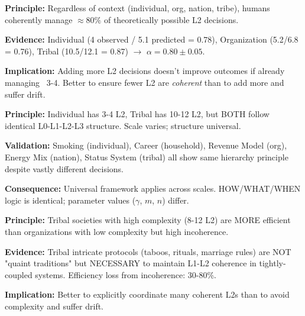 \begin{tcolorbox}[colback=blue!5!white, colframe=blue!75!black, title=Critical Foundation 3: Bounded Rationality is Universal ($\alpha \approx 0.8$)]

\textbf{Principle:} Regardless of context (individual, org, nation, tribe), humans coherently manage $\approx 80\%$ of theoretically possible L2 decisions.

\textbf{Evidence:} Individual (4 observed / 5.1 predicted = 0.78), Organization (5.2/6.8 = 0.76), Tribal (10.5/12.1 = 0.87) $\to$ $\alpha = 0.80 \pm 0.05$.

\textbf{Implication:} Adding more L2 decisions doesn't improve outcomes if already managing ~3-4. Better to ensure fewer L2 are \textit{coherent} than to add more and suffer drift.

\end{tcolorbox}

\begin{tcolorbox}[colback=blue!5!white, colframe=blue!75!black, title=Critical Foundation 4: Context Determines Scale, Not Structure]

\textbf{Principle:} Individual has 3-4 L2, Tribal has 10-12 L2, but BOTH follow identical L0-L1-L2-L3 structure. Scale varies; structure universal.

\textbf{Validation:} Smoking (individual), Career (household), Revenue Model (org), Energy Mix (nation), Status System (tribal) all show same hierarchy principle despite vastly different decisions.

\textbf{Consequence:} Universal framework applies across scales. HOW/WHAT/WHEN logic is identical; parameter values ($\gamma$, $m$, $n$) differ.

\end{tcolorbox}

\begin{tcolorbox}[colback=blue!5!white, colframe=blue!75!black, title=Critical Foundation 5: Incoherence is Costlier Than Complexity]

\textbf{Principle:} Tribal societies with high complexity (8-12 L2) are MORE efficient than organizations with low complexity but high incoherence.

\textbf{Evidence:} Tribal intricate protocols (taboos, rituals, marriage rules) are NOT "quaint traditions" but NECESSARY to maintain L1-L2 coherence in tightly-coupled systems. Efficiency loss from incoherence: 30-80\%.

\textbf{Implication:} Better to explicitly coordinate many coherent L2s than to avoid complexity and suffer drift.

\end{tcolorbox}


